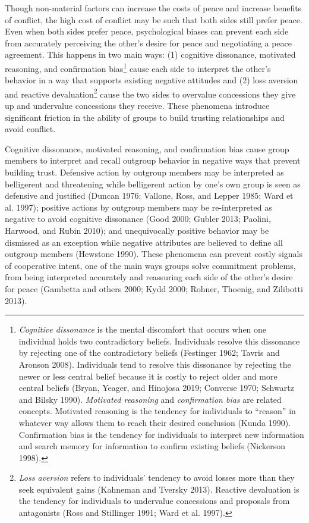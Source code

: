 \documentclass[11pt]{article}
\begin{document}
Though non-material factors can increase the costs of peace and increase
benefits of conflict, the high cost of conflict may be such that both
sides still prefer peace. Even when both sides prefer peace,
psychological biases can prevent each side from accurately perceiving
the other's desire for peace and negotiating a peace agreement. This
happens in two main ways: (1) cognitive dissonance, motivated reasoning,
and confirmation bias\footnote{\emph{Cognitive dissonance} is the mental
  discomfort that occurs when one individual holds two contradictory
  beliefs. Individuals resolve this dissonance by rejecting one of the
  contradictory beliefs (Festinger 1962; Tavris and Aronson 2008).
  Individuals tend to resolve this dissonance by rejecting the newer or
  less central belief because it is costly to reject older and more
  central beliefs (Bryan, Yeager, and Hinojosa 2019; Converse 1970;
  Schwartz and Bilsky 1990). \emph{Motivated reasoning} and
  \emph{confirmation bias} are related concepts. Motivated reasoning is
  the tendency for individuals to ``reason'' in whatever way allows them
  to reach their desired conclusion (Kunda 1990). Confirmation bias is
  the tendency for individuals to interpret new information and search
  memory for information to confirm existing beliefs (Nickerson 1998).}
cause each side to interpret the other's behavior in a way that supports
existing negative attitudes and (2) loss aversion and reactive
devaluation\footnote{\emph{Loss aversion} refers to individuals'
  tendency to avoid losses more than they seek equivalent gains
  (Kahneman and Tversky 2013). Reactive devaluation is the tendency for
  individuals to undervalue concessions and proposals from antagonists
  (Ross and Stillinger 1991; Ward et al. 1997).} cause the two sides to
overvalue concessions they give up and undervalue concessions they
receive. These phenomena introduce significant friction in the ability
of groups to build trusting relationships and avoid conflict.

Cognitive dissonance, motivated reasoning, and confirmation bias cause
group members to interpret and recall outgroup behavior in negative ways
that prevent building trust. Defensive action by outgroup members may be
interpreted as belligerent and threatening while belligerent action by
one's own group is seen as defensive and justified (Duncan 1976;
Vallone, Ross, and Lepper 1985; Ward et al. 1997); positive actions by
outgroup members may be re-interpreted as negative to avoid cognitive
dissonance (Good 2000; Gubler 2013; Paolini, Harwood, and Rubin 2010);
and unequivocally positive behavior may be dismissed as an exception
while negative attributes are believed to define all outgroup members
(Hewstone 1990). These phenomena can prevent costly signals of
cooperative intent, one of the main ways groups solve commitment
problems, from being interpreted accurately and reassuring each side of
the other's desire for peace (Gambetta and others 2000; Kydd 2000;
Rohner, Thoenig, and Zilibotti 2013).
\end{document}

